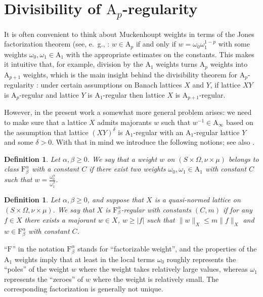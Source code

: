 \documentclass[12pt]{amsart}
\newtheorem {definition} [theorem] {Definition}
\newcommand {\apclass} [1] {\ensuremath{\mathrm A_{#1}}}
\newcommand {\frclass} [2] {\ensuremath{\mathrm F^{#1}_{#2}}}
\newcommand {\weightw} {\ensuremath {\mathit w}}
\begin{document}
\section {Divisibility of $\apclass {p}$-regularity}

\label {doapar}

It is often convenient to think about Muckenhoupt weights in terms of the Jones factorization theorem
(see, e.~g., \cite [Chapter~5, \S 5.3] {stein1993}:
$\weightw \in \apclass {p}$ if and only if $\weightw = \omega_0 \omega_1^{1 - p}$ with some weights
$\omega_0, \omega_1 \in \apclass {1}$ with the appropriate estimates on the constants.
This makes it intuitive that, for example, division by the $\apclass {1}$ weights turns $\apclass {p}$ weights
into $\apclass {p + 1}$ weights, which is the main insight behind the divisibility theorem for $\apclass {p}$-regularity
\cite [Theorem~2] {rutsky2011en}: under certain assumptions on Banach lattices $X$ and $Y$,
if lattice $X Y$ is $\apclass {p}$-regular
and lattice $Y$ is $\apclass {1}$-regular then lattice $X$ is $\apclass {p + 1}$-regular.

However, in the present work a somewhat more general problem arises: we need to make sure that a lattice
$X$ admits majorants $\weightw$ such that $\weightw^{-1} \in \apclass {\infty}$ based on the assumption
that lattice $(X Y)^{\delta}$ is $\apclass {1}$-regular with an $\apclass {1}$-regular lattice $Y$ and some $\delta > 0$.
With that in mind we introduce the following notions; see also \cite [\S 1] {rutsky2015cen}.
\begin {definition}
\label {fdef}
Let $\alpha, \beta \geqslant 0$.
We say that a weight $\weightw$ on $(S \times \Omega, \nu \times \mu)$ belongs to
class $\frclass {\alpha} {\beta}$ with a constant $C$ if there exist two weights $\omega_0, \omega_1 \in \apclass {1}$
with constant $C$ such that $\weightw = \frac {\omega_0^\alpha} {\omega_1^\beta}$.
\end {definition}
\begin {definition}
\label {frdef}
Let $\alpha, \beta \geqslant 0$, and suppose that $X$ is a quasi-normed lattice
on $(S \times \Omega, \nu \times \mu)$.  We say that $X$ is $\frclass {\alpha} {\beta}$-regular
with constants $(C, m)$ if for any $f \in X$ there exists a majorant $\weightw \in X$, $\weightw \geqslant |f|$ such that
$\|\weightw\|_X \leqslant m \|f\|_X$
and $\weightw \in \frclass {\alpha} {\beta}$ with constant $C$.
\end {definition}
``$\frclass {} {}$'' in the notation $\frclass {\alpha} {\beta}$ stands for ``factorizable weight'',
and the properties of the $\apclass {1}$ weights imply that
at least in the local terms $\omega_0$ roughly represents the ``poles'' of the weight $\weightw$
where the weight takes relatively
large values, whereas $\omega_1$ represents the ``zeroes'' of $\weightw$ where the weight is
relatively small.  The corresponding factorization is generally not unique.
\end{document}
